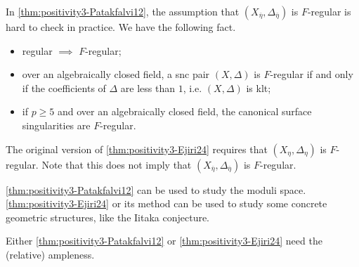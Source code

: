 \begin{remark}
	In \cref{thm:positivity3-Patakfalvi12}, the assumption that $(X_{\overline{\eta}}, \Delta_{\overline{\eta}})$ is $F$-regular is hard to check in practice.
	We have the following fact.
	\begin{itemize}
		\item regular $\implies$ $F$-regular;
		\item over an algebraically closed field, a snc pair $(X, \Delta)$ is $F$-regular if and only if the coefficients of $\Delta$ are less than $1$, i.e. $(X, \Delta)$ is klt;
		\item if $p \geq 5$ and over an algebraically closed field, the canonical surface singularities are $F$-regular.
	\end{itemize}
\end{remark}

\begin{remark}
	The original version of \cref{thm:positivity3-Ejiri24} requires that $(X_{\eta}, \Delta_{\eta})$ is $F$-regular.
	Note that this does not imply that $(X_{\overline{\eta}}, \Delta_{\overline{\eta}})$ is $F$-regular.
\end{remark}

\begin{remark}
	\cref{thm:positivity3-Patakfalvi12} can be used to study the moduli space.
	\cref{thm:positivity3-Ejiri24} or its method can be used to study some concrete geometric structures, like the Iitaka conjecture.
\end{remark}

\begin{remark}
	Either \cref{thm:positivity3-Patakfalvi12} or \cref{thm:positivity3-Ejiri24} need the (relative) ampleness.
\end{remark}

























